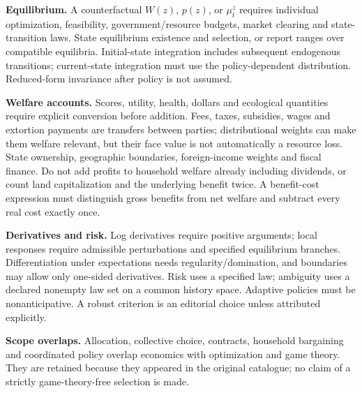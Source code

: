 \documentclass[11pt,a4paper]{article}
\begin{document}
\textbf{Equilibrium.} A counterfactual \(W(z)\), \(p(z)\), or \(\mu_t^z\) requires individual optimization, feasibility, government/resource budgets, market clearing and state-transition laws. State equilibrium existence and selection, or report ranges over compatible equilibria. Initial-state integration includes subsequent endogenous transitions; current-state integration must use the policy-dependent distribution. Reduced-form invariance after policy is not assumed.

\textbf{Welfare accounts.} Scores, utility, health, dollars and ecological quantities require explicit conversion before addition. Fees, taxes, subsidies, wages and extortion payments are transfers between parties; distributional weights can make them welfare relevant, but their face value is not automatically a resource loss. State ownership, geographic boundaries, foreign-income weights and fiscal finance. Do not add profits to household welfare already including dividends, or count land capitalization and the underlying benefit twice. A benefit-cost expression must distinguish gross benefits from net welfare and subtract every real cost exactly once.

\textbf{Derivatives and risk.} Log derivatives require positive arguments; local responses require admissible perturbations and specified equilibrium branches. Differentiation under expectations needs regularity/domination, and boundaries may allow only one-sided derivatives. Risk uses a specified law; ambiguity uses a declared nonempty law set on a common history space. Adaptive policies must be nonanticipative. A robust criterion is an editorial choice unless attributed explicitly.

\textbf{Scope overlaps.} Allocation, collective choice, contracts, household bargaining and coordinated policy overlap economics with optimization and game theory. They are retained because they appeared in the original catalogue; no claim of a strictly game-theory-free selection is made.
\end{document}
